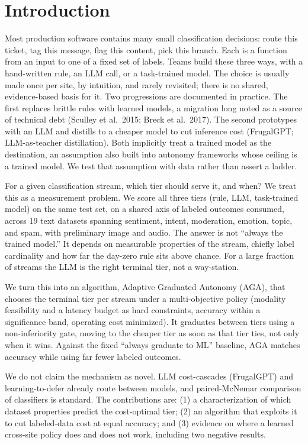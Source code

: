 \section{Introduction}\label{introduction}

Most production software contains many small classification decisions:
route this ticket, tag this message, flag this content, pick this
branch. Each is a function from an input to one of a fixed set of
labels. Teams build these three ways, with a hand-written rule, an LLM
call, or a task-trained model. The choice is usually made once per site,
by intuition, and rarely revisited; there is no shared, evidence-based
basis for it. Two progressions are documented in practice. The first
replaces brittle rules with learned models, a migration long noted as a
source of technical debt (Sculley et al.~2015; Breck et al.~2017). The
second prototypes with an LLM and distills to a cheaper model to cut
inference cost (FrugalGPT; LLM-as-teacher distillation). Both implicitly
treat a trained model as the destination, an assumption also built into
autonomy frameworks whose ceiling is a trained model. We test that
assumption with data rather than assert a ladder.

For a given classification stream, which tier should serve it, and when?
We treat this as a measurement problem. We score all three tiers (rule,
LLM, task-trained model) on the same test set, on a shared axis of
labeled outcomes consumed, across 19 text datasets spanning sentiment,
intent, moderation, emotion, topic, and spam, with preliminary image and
audio. The answer is not ``always the trained model.'' It depends on
measurable properties of the stream, chiefly label cardinality and how
far the day-zero rule sits above chance. For a large fraction of streams
the LLM is the right terminal tier, not a way-station.

We turn this into an algorithm, Adaptive Graduated Autonomy (AGA), that
chooses the terminal tier per stream under a multi-objective policy
(modality feasibility and a latency budget as hard constraints, accuracy
within a significance band, operating cost minimized). It graduates
between tiers using a non-inferiority gate, moving to the cheaper tier
as soon as that tier ties, not only when it wins. Against the fixed
``always graduate to ML'' baseline, AGA matches accuracy while using far
fewer labeled outcomes.

We do not claim the mechanism as novel. LLM cost-cascades (FrugalGPT)
and learning-to-defer already route between models, and paired-McNemar
comparison of classifiers is standard. The contributions are: (1) a
characterization of which dataset properties predict the cost-optimal
tier; (2) an algorithm that exploits it to cut labeled-data cost at
equal accuracy; and (3) evidence on where a learned cross-site policy
does and does not work, including two negative results.

